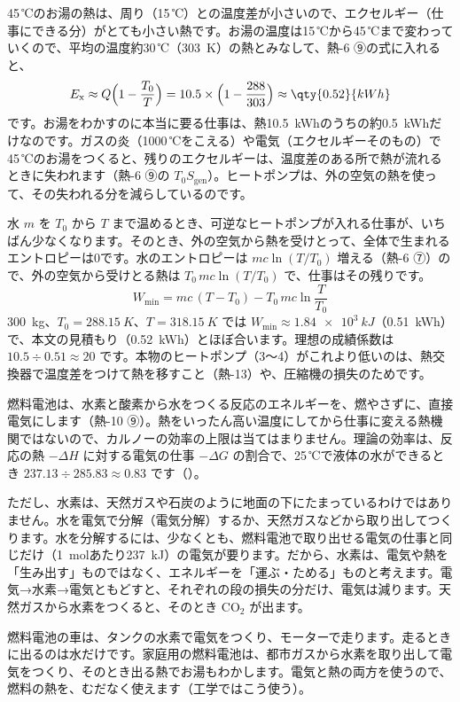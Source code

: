 45\,℃のお湯の熱は、周り（15\,℃）との温度差が小さいので、エクセルギー（仕事にできる分）がとても小さい熱です。お湯の温度は15\,℃から45\,℃まで変わっていくので、平均の温度約30\,℃（\qty{303}{K}）の熱とみなして、熱-6 ⑨の式に入れると、
\[E_{\mathrm x}\approx Q\Bigl(1-\frac{T_0}{T}\Bigr)=10.5\times\Bigl(1-\frac{288}{303}\Bigr)\approx\qty{0.52}{kWh}\]
です。お湯をわかすのに本当に要る仕事は、熱\qty{10.5}{kWh}のうちの約\qty{0.5}{kWh}だけなのです。ガスの炎（1000\,℃をこえる）や電気（エクセルギーそのもの）で45\,℃のお湯をつくると、残りのエクセルギーは、温度差のある所で熱が流れるときに失われます（熱-6 ⑨の $T_0S_{\mathrm{gen}}$）。ヒートポンプは、外の空気の熱を使って、その失われる分を減らしているのです。

\begin{motto}[4]
水 $m$ を $T_0$ から $T$ まで温めるとき、可逆なヒートポンプが入れる仕事が、いちばん少なくなります。そのとき、外の空気から熱を受けとって、全体で生まれるエントロピーは0です。水のエントロピーは $mc\ln(T/T_0)$ 増える（熱-6 ⑦）ので、外の空気から受けとる熱は $T_0\,mc\ln(T/T_0)$ で、仕事はその残りです。
\[W_{\min}=mc\,(T-T_0)-T_0\,mc\ln\frac{T}{T_0}\]
\qty{300}{kg}、$T_0=\qty{288.15}{K}$、$T=\qty{318.15}{K}$ では $W_{\min}\approx\qty{1.84e3}{kJ}$（\qty{0.51}{kWh}）で、本文の見積もり（\qty{0.52}{kWh}）とほぼ合います。理想の成績係数は $10.5\div0.51\approx20$ です。本物のヒートポンプ（3〜4）がこれより低いのは、熱交換器で温度差をつけて熱を移すこと（熱-13）や、圧縮機の損失のためです。
\end{motto}

\leavevmode\label{ph:熱-16:sec7}燃料電池は、水素と酸素から水をつくる反応のエネルギーを、燃やさずに、直接電気にします（熱-10 ⑨）。熱をいったん高い温度にしてから仕事に変える熱機関ではないので、カルノーの効率の上限は当てはまりません。理論の効率は、反応の熱 $-\Delta H$ に対する電気の仕事 $-\Delta G$ の割合で、25\,℃で液体の水ができるとき $237.13\div285.83\approx0.83$ です（）。

ただし、水素は、天然ガスや石炭のように地面の下にたまっているわけではありません。水を電気で分解（電気分解）するか、天然ガスなどから取り出してつくります。水を分解するには、少なくとも、燃料電池で取り出せる電気の仕事と同じだけ（\qty{1}{mol}あたり\qty{237}{kJ}）の電気が要ります。だから、水素は、電気や熱を「生み出す」ものではなく、エネルギーを「運ぶ・ためる」ものと考えます。電気→水素→電気ともどすと、それぞれの段の損失の分だけ、電気は減ります。天然ガスから水素をつくると、そのとき CO$_2$ が出ます。
\begin{phmijika}
燃料電池の車は、タンクの水素で電気をつくり、モーターで走ります。走るときに出るのは水だけです。家庭用の燃料電池は、都市ガスから水素を取り出して電気をつくり、そのとき出る熱でお湯もわかします。電気と熱の両方を使うので、燃料の熱を、むだなく使えます（工学ではこう使う）。
\end{phmijika}

